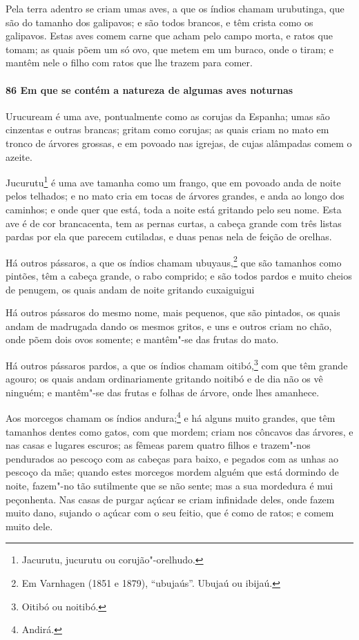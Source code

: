 Pela terra adentro se criam umas aves, a que os índios chamam urubutinga, que são do
tamanho dos galipavos; e são todos brancos, e têm crista como os galipavos. Estas aves
comem carne que acham pelo campo morta, e ratos que tomam; as quais põem um só ovo, que
metem em um buraco, onde o tiram; e mantêm nele o filho com ratos que lhe trazem para
comer.

\paragraph{86 Em que se contém a natureza de algumas aves noturnas}

Urucuream é uma ave, pontualmente como as corujas da Espanha; umas são cinzentas e outras
brancas; gritam como corujas; as quais criam no mato em tronco de árvores grossas, e em
povoado nas igrejas, de cujas alâmpadas comem o azeite.

Jucurutu\footnote{ Jacurutu, jucurutu ou corujão"-orelhudo.} é uma ave tamanha como um
frango, que em povoado anda de noite pelos telhados; e no mato cria em tocas de árvores
grandes, e anda ao longo dos caminhos; e onde quer que está, toda a noite está gritando
pelo seu nome. Esta ave é de cor brancacenta, tem as pernas curtas, a cabeça grande com
três listas pardas por ela que parecem cutiladas, e duas penas nela de feição de orelhas.

Há outros pássaros, a que os índios chamam ubuyaus,\footnote{ Em Varnhagen (1851 e 1879),
``ubujaús''. Ubujaú ou ibijaú.} que são tamanhos como pintões, têm a cabeça grande, o
rabo comprido; e são todos pardos e muito cheios de penugem, os quais andam de noite
gritando cuxaiguigui

Há outros pássaros do mesmo nome, mais pequenos, que são pintados, os quais andam de
madrugada dando os mesmos gritos, e uns e outros criam no chão, onde põem dois ovos
somente; e mantêm"-se das frutas do mato.

Há outros pássaros pardos, a que os índios chamam oitibó,\footnote{ Oitibó ou noitibó.}
com que têm grande agouro; os quais andam ordinariamente gritando noitibó e de dia não os
vê ninguém; e mantêm"-se das frutas e folhas de árvore, onde lhes amanhece.

Aos morcegos chamam os índios andura;\footnote{ Andirá.} e há alguns muito grandes, que
têm tamanhos dentes como gatos, com que mordem; criam nos côncavos das árvores, e nas
casas e lugares escuros; as fêmeas parem quatro filhos e trazem"-nos pendurados ao pescoço
com as cabeças para baixo, e pegados com as unhas ao pescoço da mãe; quando estes morcegos
mordem alguém que está dormindo de noite, fazem"-no tão sutilmente que se não sente; mas a
sua mordedura é mui peçonhenta. Nas casas de purgar açúcar se criam infinidade deles, onde
fazem muito dano, sujando o açúcar com o seu feitio, que é como de ratos; e comem muito
dele.

